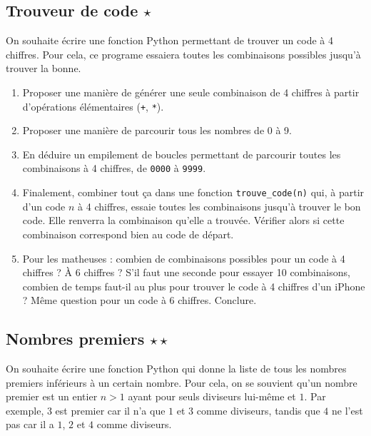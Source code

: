 \documentclass[12pt,a4paper, oneside]{article}
\theoremstyle{definition}
\begin{document}
   \subsection{Trouveur de code $\star$}\label{subsec:trouveur-de-code}
   On souhaite écrire une fonction Python permettant de trouver un code à 4 chiffres.
   Pour cela, ce programe essaiera toutes les combinaisons possibles jusqu'à trouver la bonne.
   \begin{enumerate}
      \item Proposer une manière de générer une seule combinaison de 4 chiffres à partir d'opérations élémentaires (\texttt{+}, \texttt{*}).
      \item Proposer une manière de parcourir tous les nombres de 0 à 9.
      \item En déduire un empilement de boucles permettant de parcourir toutes les combinaisons à 4 chiffres, de \texttt{0000} à \texttt{9999}.
      \item Finalement, combiner tout ça dans une fonction \texttt{trouve\_code(n)} qui, à partir d'un code $n$ à 4 chiffres, essaie toutes les combinaisons jusqu'à trouver le bon code.
      Elle renverra la combinaison qu'elle a trouvée.
      Vérifier alors si cette combinaison correspond bien au code de départ.
      \item Pour les matheuses : combien de combinaisons possibles pour un code à 4 chiffres ?
      À 6 chiffres ?
      S'il faut une seconde pour essayer 10 combinaisons, combien de temps faut-il au plus pour trouver le code à 4 chiffres d'un iPhone ?
      Même question pour un code à 6 chiffres.
      Conclure.
   \end{enumerate}

   \subsection{Nombres premiers $\star\star$}\label{subsec:nombres-premiers}
   On souhaite écrire une fonction Python qui donne la liste de tous les nombres premiers inférieurs à un certain nombre.
   Pour cela, on se souvient qu'un nombre premier est un entier $n > 1$ ayant pour seuls diviseurs lui-même et $1$.
   Par exemple, $3$ est premier car il n'a que $1$ et $3$ comme diviseurs, tandis que $4$ ne l'est pas car il a $1$, $2$ et $4$ comme diviseurs.
\end{document}
